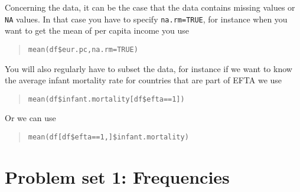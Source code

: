 \documentclass{tufte-handout}
\begin{document}
\newline
\vspace*{.5cm}
Concerning the data, it can be the case that the data contains missing values or \texttt{NA} values. 
In that case you have to specify \texttt{na.rm=TRUE}, for instance when you want to get the mean of per capita income you use 
\begin{quote}
  \texttt{mean(df\$eur.pc,na.rm=TRUE)}
\end{quote}

You will also regularly have to subset the data, for instance if we want to know the average infant mortality rate for countries that are part of EFTA we use
\begin{quote}
  \texttt{mean(df\$infant.mortality[df\$efta==1])}
\end{quote}
Or we can use
\begin{quote}
  \texttt{mean(df[df\$efta==1,]\$infant.mortality)}
\end{quote}


\clearpage
\section{Problem set 1: Frequencies}
\end{document}
